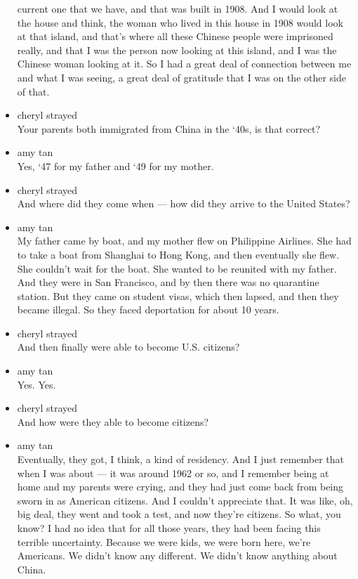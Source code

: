 \begin{itemize}
  current one that we have, and that was built in 1908. And I would look
  at the house and think, the woman who lived in this house in 1908
  would look at that island, and that's where all these Chinese people
  were imprisoned really, and that I was the person now looking at this
  island, and I was the Chinese woman looking at it. So I had a great
  deal of connection between me and what I was seeing, a great deal of
  gratitude that I was on the other side of that.
\item
  cheryl strayed\\
  Your parents both immigrated from China in the `40s, is that correct?
\item
  amy tan\\
  Yes, `47 for my father and `49 for my mother.
\item
  cheryl strayed\\
  And where did they come when --- how did they arrive to the United
  States?
\item
  amy tan\\
  My father came by boat, and my mother flew on Philippine Airlines. She
  had to take a boat from Shanghai to Hong Kong, and then eventually she
  flew. She couldn't wait for the boat. She wanted to be reunited with
  my father. And they were in San Francisco, and by then there was no
  quarantine station. But they came on student visas, which then lapsed,
  and then they became illegal. So they faced deportation for about 10
  years.
\item
  cheryl strayed\\
  And then finally were able to become U.S. citizens?
\item
  amy tan\\
  Yes. Yes.
\item
  cheryl strayed\\
  And how were they able to become citizens?
\item
  amy tan\\
  Eventually, they got, I think, a kind of residency. And I just
  remember that when I was about --- it was around 1962 or so, and I
  remember being at home and my parents were crying, and they had just
  come back from being sworn in as American citizens. And I couldn't
  appreciate that. It was like, oh, big deal, they went and took a test,
  and now they're citizens. So what, you know? I had no idea that for
  all those years, they had been facing this terrible uncertainty.
  Because we were kids, we were born here, we're Americans. We didn't
  know any different. We didn't know anything about China.

\end{itemize}
